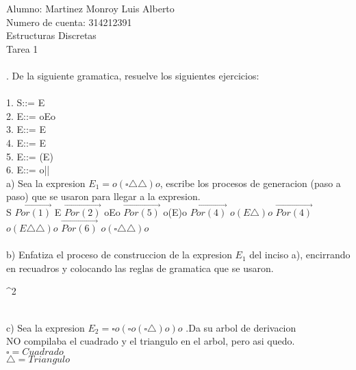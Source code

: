 \documentclass{book}
\begin{document}
Alumno: Martinez Monroy Luis Alberto \\
Numero de cuenta: 314212391 \\
Estructuras Discretas\\
Tarea 1 \\ \\
{\fontsize{20}{0}. De la siguiente gramatica, resuelve los siguientes ejercicios:}\\ \\
1. S::= E\\
2. E::= oEo\\
3. E::= \square E\\
4. E::= E\triangle\\
5. E::= (E)\\
6. E::= o|\square |\triangle\\

a) Sea la expresion $E_{1}=o(\square \triangle \triangle)o $, escribe los procesos de generacion (paso a paso) que se usaron para llegar a la expresion.\\

S $\overrightarrow{Por (1)} $   E $\overrightarrow{Por (2)} $   oEo $\overrightarrow {Por (5)}$ o(E)o $\overrightarrow{Por (4)}$ $o(E\triangle)o$ $\overrightarrow{Por (4)}$ $o(E\triangle \triangle)o$ $\overrightarrow {Por (6)}$ $o(\square \triangle \triangle)o$\\ \\

b) Enfatiza el proceso de construccion de la expresion $E_{1}$ del inciso a), encirrando en recuadros y colocando las reglas de gramatica que se usaron.\\
\begin{center}
   ^2 \\ \\
\end{center}
c) Sea la expresion $E_{2} = \square o (\square o (\square \triangle)o)o$ .Da su arbol de derivacion \\

NO compilaba el cuadrado y el triangulo en el arbol, pero asi quedo.\\
$\square = Cuadrado $\\
$\triangle = Triangulo$\\
\end{document}

